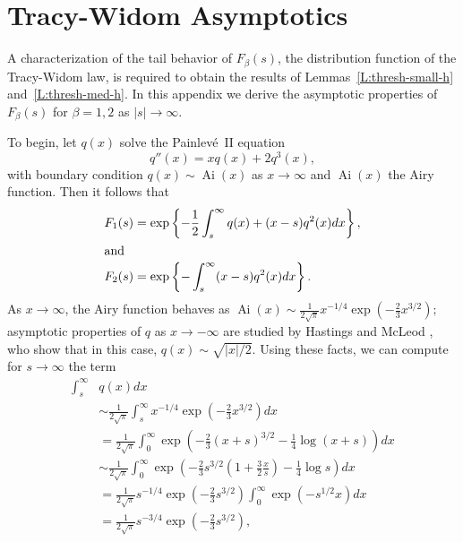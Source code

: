 \documentclass[final]{IEEEtran} %
\newcommand{\half}{\frac{1}{2}}
\DeclareMathOperator*{\Ai}{Ai}
\begin{document}
\appendices

\section{Tracy-Widom Asymptotics}\label{S:tw-asymp}

A characterization of the tail behavior of $F_\beta(s)$, the distribution function of the Tracy-Widom law, is required to obtain the results of Lemmas~\ref{L:thresh-small-h} and~\ref{L:thresh-med-h}.  In this appendix we derive the asymptotic properties of $F_\beta(s)$ for $\beta=1,2$ as
$|s| \to \infty$.

To begin, let $q(x)$ solve the Painlev\'e~II equation
\[
    q''(x) = x q(x) + 2 q^3(x),
\]
with boundary condition $q(x) \sim \Ai(x)$ as $x \to \infty$ and $\Ai(x)$ the Airy function. Then it follows that
\begin{align*}
    F_1(s)
        &= \exp \left\{
            -\half \int_s^\infty q(x) + (x - s) q^2(x) dx
        \right\}, \\
\intertext{and}
    F_2(s)
        &= \exp \left\{
            - \int_s^\infty (x - s) q^2(x) dx
        \right\}.
\end{align*}
As $x \to \infty$, the Airy function behaves as
\(
    \Ai(x)
        \sim \frac{1}{2\sqrt{\pi}} x^{-1/4}
             \exp \left( -\frac{2}{3} x^{3/2} \right);
\)
asymptotic properties of $q$ as $x \to -\infty$ are studied by Hastings and McLeod \cite{hastings1980bvp}, who show that in this case,
\(
    q(x) \sim \sqrt{ |x| / 2 }.
\)
Using these facts, we can compute for $s \to \infty$ the term
\begin{align*}
    \int_s^\infty & q(x) dx \\
        & \sim \frac{1}{2 \sqrt{\pi}}
              \int_s^\infty
                   x^{-1/4} \exp\left( -\frac{2}{3} x^{3/2} \right) dx \\
        &= \frac{1}{2 \sqrt{\pi}}
           \int_0^\infty
               \exp\left(
                   -\frac{2}{3} (x + s)^{3/2} - \frac{1}{4} \log (x + s)
               \right) dx \\
        &\sim \frac{1}{2 \sqrt{\pi}}
              \int_0^\infty
                  \exp\left(
                      -\frac{2}{3} s^{3/2}
                      \left(
                          1 + \frac{3}{2} \frac{x}{s}
                      \right)
                      - \frac{1}{4} \log s
                  \right)
                  dx \\
        &= \frac{1}{2 \sqrt{\pi}} s^{-1/4}
           \exp\left( -\frac{2}{3} s^{3/2} \right)
           \int_0^\infty \exp\left( -s^{1/2} x \right) dx \\
        &= \frac{1}{2 \sqrt{\pi}} s^{-3/4}
           \exp\left( -\frac{2}{3} s^{3/2} \right) ,
\end{align*}
\end{document}
